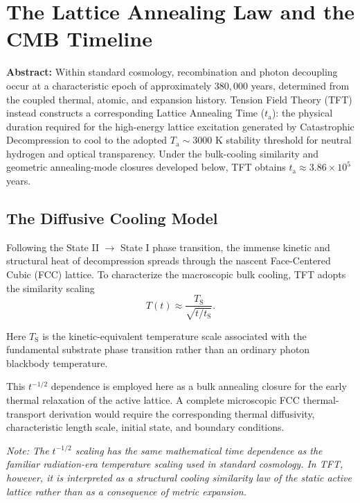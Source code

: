 \chapter{The Lattice Annealing Law and the CMB Timeline}
\label{app:lattice_annealing}

\noindent\textbf{Abstract:} Within standard cosmology, recombination and photon decoupling occur at a characteristic epoch of approximately $380{,}000$ years, determined from the coupled thermal, atomic, and expansion history. Tension Field Theory (TFT) instead constructs a corresponding Lattice Annealing Time ($t_{\mathrm{a}}$): the physical duration required for the high-energy lattice excitation generated by Catastrophic Decompression to cool to the adopted $T_{\mathrm{a}} \sim 3000$ K stability threshold for neutral hydrogen and optical transparency. Under the bulk-cooling similarity and geometric annealing-mode closures developed below, TFT obtains $t_{\mathrm{a}} \approx 3.86 \times 10^5$ years.


\section{The Diffusive Cooling Model}

Following the State II $\to$ State I phase transition, the immense kinetic and structural heat of decompression spreads through the nascent Face-Centered Cubic (FCC) lattice. To characterize the macroscopic bulk cooling, TFT adopts the similarity scaling
\begin{equation}
    T(t) \approx \frac{T_{\mathrm S}}{\sqrt{t/t_{\mathrm S}}}.
\end{equation}

Here $T_{\mathrm S}$ is the kinetic-equivalent temperature scale associated with the fundamental substrate phase transition rather than an ordinary photon blackbody temperature.

This $t^{-1/2}$ dependence is employed here as a bulk annealing closure for the early thermal relaxation of the active lattice. A complete microscopic FCC thermal-transport derivation would require the corresponding thermal diffusivity, characteristic length scale, initial state, and boundary conditions.

\vspace{0.5em}
\noindent\textit{Note: The $t^{-1/2}$ scaling has the same mathematical time dependence as the familiar radiation-era temperature scaling used in standard cosmology. In TFT, however, it is interpreted as a structural cooling similarity law of the static active lattice rather than as a consequence of metric expansion.}


